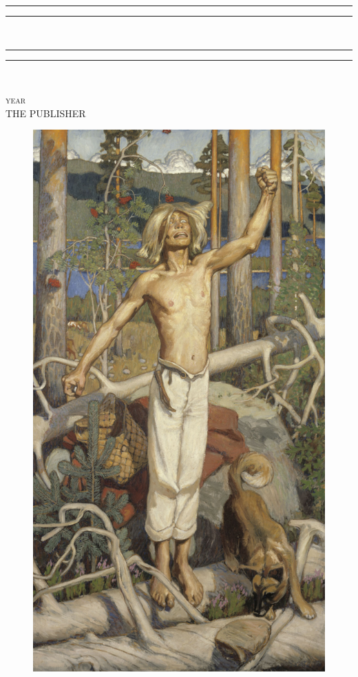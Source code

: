 \documentclass{report}
\title{\textfrak{Kalevala}}
\author{\textfrak{koonnut:\\Elias Lönnrot}}
\begin{document}
\begin{titlepage}
    \centering
   
    \textcolor{BrickRed}{\rule{\textwidth}{1.6pt}\vspace*{-\baselineskip}\vspace*{2pt}
    \rule{\textwidth}{0.4pt}}\\[\baselineskip]
    \Huge{}
    \textcolor{BrickRed}{\rule{\textwidth}{0.4pt}\vspace*{-\baselineskip}\vspace{3.2pt}
    \rule{\textwidth}{1.6pt}}\\[\baselineskip]

    \vspace*{2\baselineskip}
    
    \LARGE{}
    
    \vfill
    {\scshape year} \\
    {\large THE PUBLISHER}\par
	\end{titlepage}
	
	\begin{figure}[ht]
		\centering
			\includegraphics[width=1.00\textwidth]{./img/kullervo.png}
	\end{figure}
	
	
	
	
\end{document}
